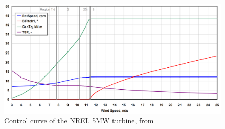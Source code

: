 \documentclass[hyperref,final,beleg]{cgvpub}
\begin{document}
\begin{figure}
  \centering
  \includegraphics{images/NREL-5MW.png}
  \caption{Control curve of the NREL 5MW turbine, from \cite{jonkmanDefinition5MWReference2009}}
  \label{fig:nrel5mw}
\end{figure}
\end{document}
